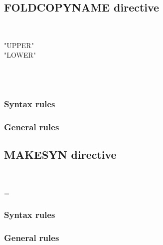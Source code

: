 \subsection{FOLDCOPYNAME directive}

\begin{syntax}[\miscextcolour]
  \begin{1=}
     \\
  \end{1=}
  \begin{1=}
    "UPPER" \\
    "LOWER"
  \end{1=}
\end{syntax}

\begin{syntax}[\miscextcolour]
  \begin{1=}
     \\
     \\
  \end{1=}
\end{syntax}

\subsubsection{Syntax rules}

\subsubsection{General rules}

\subsection{MAKESYN directive}

\begin{syntax}[\miscextcolour]
  \begin{1=}
     \\
  \end{1=}
  \literal = \literal
\end{syntax}

\subsubsection{Syntax rules}

\subsubsection{General rules}

